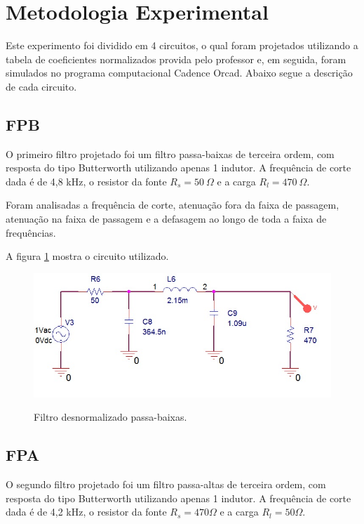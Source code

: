 \newpage
\section{Metodologia Experimental}

Este experimento foi dividido em 4 circuitos, o qual foram projetados utilizando a tabela de coeficientes normalizados provida pelo professor e, em seguida, foram simulados no programa computacional Cadence Orcad. Abaixo segue a descrição de cada circuito.

\subsection{FPB}
O primeiro filtro projetado foi um filtro passa-baixas de terceira ordem, com resposta do tipo Butterworth utilizando apenas 1 indutor. A frequência de corte dada é de 4,8 kHz, o resistor da fonte $R_s = 50\ \Omega$ e a carga $R_l = 470\ \Omega$.

Foram analisadas a frequência de corte, atenuação fora da faixa de passagem, atenuação na faixa de passagem e a defasagem ao longo de toda a faixa de frequências.

A figura \ref{fFPB} mostra o circuito utilizado.\begin{figure}[H]
\centering

\includegraphics[scale=0.8]{Imagens/fpb.jpg}
\label{fFPB}
\caption{Filtro desnormalizado passa-baixas.}
\end{figure}



\subsection{FPA}
O segundo filtro projetado foi um filtro passa-altas de terceira ordem, com resposta do tipo Butterworth utilizando apenas 1 indutor. A frequência de corte dada é de 4,2 kHz, o resistor da fonte $R_s = 470 \Omega$ e a carga $R_l = 50 \Omega$.

